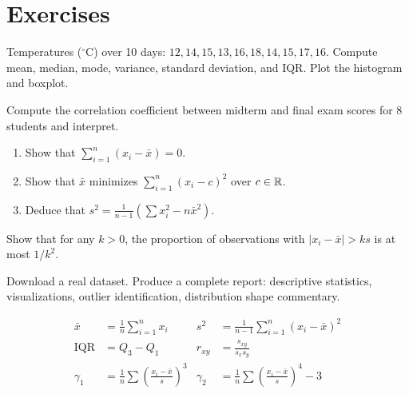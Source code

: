 \section{Exercises}

\begin{exercise}
Temperatures (${}^\circ$C) over 10 days: $12, 14, 15, 13, 16, 18, 14, 15, 17, 16$. Compute mean, median, mode, variance, standard deviation, and IQR. Plot the histogram and boxplot.
\end{exercise}

\begin{exercise}
Compute the correlation coefficient between midterm and final exam scores for 8 students and interpret.
\end{exercise}

\begin{exercise}
\begin{enumerate}
\item Show that $\sum_{i=1}^n (x_i - \bar{x}) = 0$.
\item Show that $\bar{x}$ minimizes $\sum_{i=1}^n (x_i - c)^2$ over $c\in\mathbb{R}$.
\item Deduce that $s^2 = \frac{1}{n-1}\left(\sum x_i^2 - n\bar{x}^2\right)$.
\end{enumerate}
\end{exercise}

\begin{exercise}
Show that for any $k>0$, the proportion of observations with $|x_i-\bar{x}|>ks$ is at most $1/k^2$.
\end{exercise}

\begin{exercise}
Download a real dataset. Produce a complete report: descriptive statistics, visualizations, outlier identification, distribution shape commentary.
\end{exercise}

\begin{keyformulas}
\begin{align*}
\bar{x} &= \frac{1}{n}\sum_{i=1}^n x_i &
s^2 &= \frac{1}{n-1}\sum_{i=1}^n(x_i-\bar{x})^2 \\
\mathrm{IQR} &= Q_3 - Q_1 &
r_{xy} &= \frac{s_{xy}}{s_x s_y} \\
\gamma_1 &= \frac{1}{n}\sum\left(\frac{x_i-\bar{x}}{s}\right)^3 &
\gamma_2 &= \frac{1}{n}\sum\left(\frac{x_i-\bar{x}}{s}\right)^4-3
\end{align*}
\end{keyformulas}
